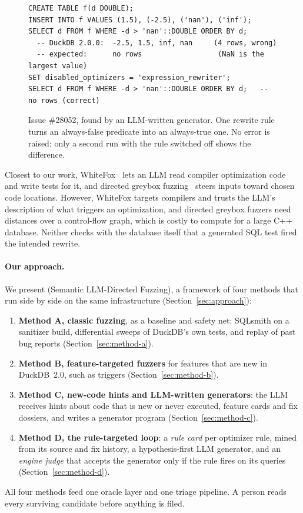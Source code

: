 \begin{figure}[t]
\begin{lstlisting}[basicstyle=\ttfamily\footnotesize,frame=single,columns=fullflexible]
CREATE TABLE f(d DOUBLE);
INSERT INTO f VALUES (1.5), (-2.5), ('nan'), ('inf');
SELECT d FROM f WHERE -d > 'nan'::DOUBLE ORDER BY d;
  -- DuckDB 2.0.0:  -2.5, 1.5, inf, nan     (4 rows, wrong)
  -- expected:      no rows                  (NaN is the largest value)
SET disabled_optimizers = 'expression_rewriter';
SELECT d FROM f WHERE -d > 'nan'::DOUBLE ORDER BY d;   -- no rows (correct)
\end{lstlisting}
\caption{Issue \#28052, found by an LLM-written generator. One rewrite rule turns an always-false predicate into an
always-true one. No error is raised; only a second run with the rule switched off shows the difference.}
\label{fig:motivating}
\end{figure}

Closest to our work, WhiteFox~\cite{yang2024whitefox} lets an LLM read compiler optimization code and write tests for
it, and directed greybox fuzzing~\cite{bohme2017aflgo} steers inputs toward chosen code locations. However, WhiteFox
targets compilers and trusts the LLM's description of what triggers an optimization, and directed greybox fuzzers need
distances over a control-flow graph, which is costly to compute for a large C++ database. Neither checks with the
database itself that a generated SQL test fired the intended rewrite.

\paragraph{Our approach.} We present \tool (Semantic LLM-Directed Fuzzing), a framework of four methods that run side
by side on the same infrastructure (Section~\ref{sec:approach}):
\begin{enumerate}
  \item \textbf{Method A, classic fuzzing}, as a baseline and safety net: SQLsmith on a sanitizer build, differential
        sweeps of DuckDB's own tests, and replay of past bug reports (Section~\ref{sec:method-a}).
  \item \textbf{Method B, feature-targeted fuzzers} for features that are new in DuckDB~2.0, such as triggers
        (Section~\ref{sec:method-b}).
  \item \textbf{Method C, new-code hints and LLM-written generators}: the LLM receives hints about code that is new or
        never executed, feature cards and fix dossiers, and writes a generator program (Section~\ref{sec:method-c}).
  \item \textbf{Method D, the rule-targeted loop}: a \emph{rule card} per optimizer rule, mined from its source and fix
        history, a hypothesis-first LLM generator, and an \emph{engine judge} that accepts the generator only if the rule
        fires on its queries (Section~\ref{sec:method-d}).
\end{enumerate}
All four methods feed one oracle layer and one triage pipeline. A person reads every surviving candidate before
anything is filed.

